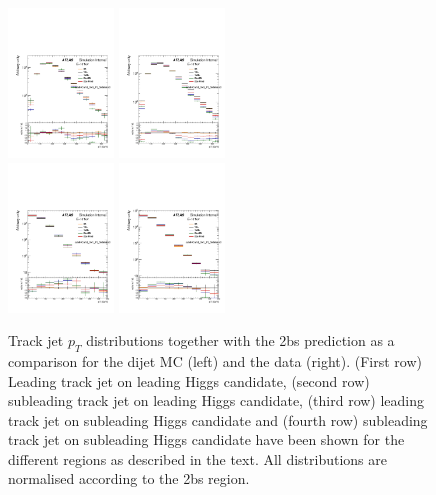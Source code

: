 \begin{figure}[htbp!]
\begin{center}
\includegraphics[angle=270, width=0.25\textwidth]{./figures/boosted/AppendixDijetMC/sublHCand_trk0_Pt_Sidebandlessbin_log.pdf}
\includegraphics[angle=270, width=0.25\textwidth]{./figures/boosted/AppendixDijetMC/sublHCand_trk0_Pt_Sidebanddata_log.pdf}\\
\includegraphics[angle=270, width=0.25\textwidth]{./figures/boosted/AppendixDijetMC/sublHCand_trk1_Pt_Sidebandlessbin_log.pdf}
\includegraphics[angle=270, width=0.25\textwidth]{./figures/boosted/AppendixDijetMC/sublHCand_trk1_Pt_Sidebanddata_log.pdf}

 \caption{Track jet $p_{T}$ distributions together with the 2bs prediction as a comparison for the dijet MC (left) and the data (right). (First row) Leading track jet on leading Higgs candidate, (second row) subleading track jet on leading Higgs candidate, (third row) leading track jet on subleading Higgs candidate and (fourth row) subleading track jet on subleading Higgs candidate have been shown for the different regions as described in the text. All distributions are normalised according to the 2bs region.}

\label{fig:TjPred}
\end{center}
\end{figure}

